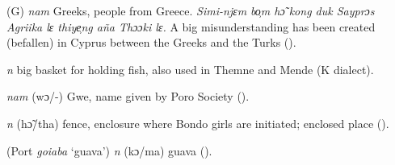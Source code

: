 \begin{letter}{(G)}
 \textit{nam} Greeks, people from Greece. \textit{Simi-njɛm bo̹m hɔ̃ kong duk Sayprɔs Agriika lɛ thiye̹ng aña Thɔɔki lɛ.} A big misunderstanding has been created (befallen) in Cyprus between the Greeks and the Turks (\citealt{Pichl1967}). 

 \textit{n} big basket for holding fish, also used in Themne and Mende (K dialect). 

 \textit{nam} (wɔ/-) Gwe, name given by Poro Society (\citealt{Pichl1967}). 

 \textit{n} (hɔ̃/tha) fence, enclosure where Bondo girls are initiated; enclosed place (\citealt{Pichl1967}).

 (Port \textit{goiaba} ‘guava') \textit{n} (kɔ/ma) guava (\citealt{Pichl1967}).


\end{letter}
